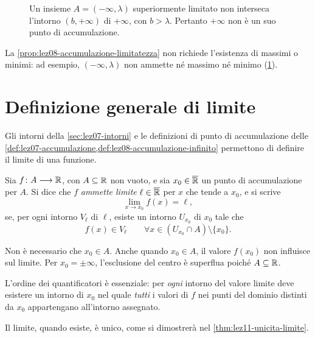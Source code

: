 \begin{figure}[htbp]
  \centering
  
  \caption{Un insieme \(A=(-\infty,\lambda)\) superiormente limitato
  non interseca l'intorno \((b,+\infty)\) di \(+\infty\), con
  \(b>\lambda\). Pertanto \(+\infty\) non è un suo punto di
  accumulazione.}
  \label{fig:lez08-accumulazione-infinito}
\end{figure}

La \cref{prop:lez08-accumulazione-limitatezza} non richiede
l'esistenza di massimi o minimi: ad esempio,
\((-\infty,\lambda)\) non ammette né massimo né minimo
(\cref{fig:lez08-accumulazione-infinito}).

\clearpage

\section{Definizione generale di limite}
\label{sec:lez08-limiti-definizione}

Gli intorni della \cref{sec:lez07-intorni} e le definizioni
di punto di accumulazione delle
\cref{def:lez07-accumulazione,def:lez08-accumulazione-infinito}
permettono di definire il limite di una funzione.

\begin{definition}
\label{def:lez08-limite}
Sia \(f\colon A\longrightarrow\mathbb{R}\), con \(A\subseteq\mathbb{R}\)
non vuoto, e sia \(x_0\in\overline{\mathbb{R}}\) un punto di
accumulazione per \(A\). Si dice che \(f\) \emph{ammette limite}
\(\ell\in\overline{\mathbb{R}}\) per \(x\) che tende a \(x_0\),
e si scrive
\[
  \lim_{x\to x_0}f(x)=\ell,
\]
se, per ogni intorno \(V_\ell\) di \(\ell\), esiste un intorno
\(U_{x_0}\) di \(x_0\) tale che
\[
  f(x)\in V_\ell
  \qquad\forall x\in(U_{x_0}\cap A)\setminus\{x_0\}.
\]
\end{definition}

Non è necessario che \(x_0\in A\). Anche quando
\(x_0\in A\), il valore \(f(x_0)\) non influisce sul limite.
Per \(x_0=\pm\infty\), l'esclusione del centro è superflua
poiché \(A\subseteq\mathbb{R}\).

L'ordine dei quantificatori è essenziale: per \emph{ogni}
intorno del valore limite deve esistere un intorno di
\(x_0\) nel quale \emph{tutti} i valori di \(f\) nei
punti del dominio distinti da \(x_0\) appartengano
all'intorno assegnato.

Il limite, quando esiste, è unico, come si dimostrerà nel
\cref{thm:lez11-unicita-limite}.

